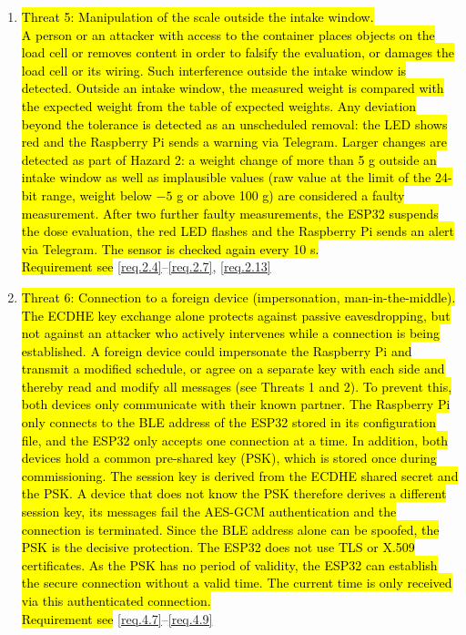 \begin{enumerate}
  \item \hl{Threat 5: Manipulation of the scale outside the intake window.}\\
  \hl{A person or an attacker with access to the container places objects on the
  load cell or removes content in order to falsify the evaluation, or damages
  the load cell or its wiring. Such interference outside the intake window is
  detected. Outside an intake window, the measured weight is compared with the
  expected weight from the table of expected weights. Any deviation beyond the
  tolerance is detected as an unscheduled removal: the LED shows red and the
  Raspberry Pi sends a warning via Telegram. Larger changes are detected as part
  of Hazard 2: a weight change of more than 5 g outside an
  intake window as well as implausible values (raw value at the limit of the
  24-bit range, weight below {$-5$} g or above 100 g) are
  considered a faulty measurement. After two further faulty measurements, the
  ESP32 suspends the dose evaluation, the red LED flashes and the Raspberry Pi
  sends an alert via Telegram. The sensor is checked again every 10 s.}\\
  \hl{Requirement see} \ref{req.2.4}--\ref{req.2.7}, \ref{req.2.13}
  \item \hl{Threat 6: Connection to a foreign device (impersonation, man-in-the-middle).}\\
  \hl{The ECDHE key exchange alone protects against passive eavesdropping, but not
  against an attacker who actively intervenes while a connection is being
  established. A foreign device could impersonate the Raspberry Pi and transmit a
  modified schedule, or agree on a separate key with each side and thereby read
  and modify all messages (see Threats 1 and 2). To prevent this, both devices
  only communicate with their known partner. The Raspberry Pi only connects to the
  BLE address of the ESP32 stored in its configuration file, and the ESP32 only
  accepts one connection at a time. In addition, both devices hold a common
  pre-shared key (PSK), which is stored once during commissioning. The session key
  is derived from the ECDHE shared secret and the PSK. A device that does not know
  the PSK therefore derives a different session key, its messages fail the
  AES-GCM authentication and the connection is terminated. Since the BLE address
  alone can be spoofed, the PSK is the decisive protection. The ESP32 does not
  use TLS or X.509 certificates. As the PSK has no period of validity, the ESP32
  can establish the secure connection without a valid time. The current time is
  only received via this authenticated connection.}\\
  \hl{Requirement see} \ref{req.4.7}--\ref{req.4.9}


\end{enumerate}
